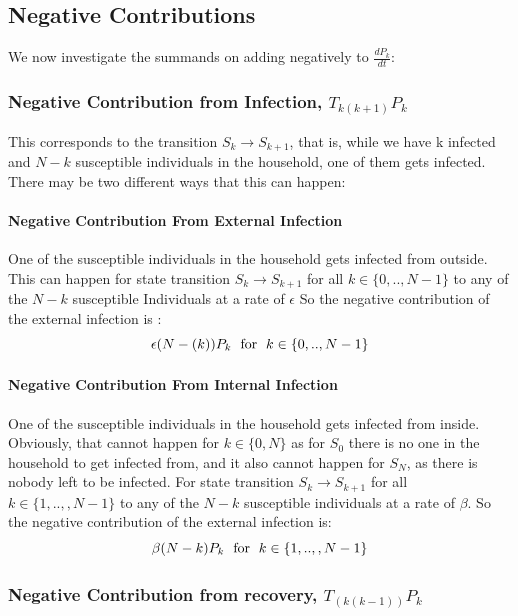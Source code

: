 \documentclass[paper=a4, fontsize=11pt, twoside, BCOR=12mm, parskip=full, listof=totoc]{scrreprt}
\begin{document}
\subsection*{Negative Contributions}
	We now investigate the summands on adding negatively to $\frac{dP_k}{dt}$:

\subsubsection*{Negative Contribution from Infection, $T_{k(k+1)}P_k$}
	This corresponds to the transition $S_{k}\rightarrow S_{k+1}$, that is, while we have k infected and $N-k$ susceptible individuals in the household, one of them  gets infected.
	There may be two different ways that this can happen:
\paragraph*{Negative Contribution From External Infection}
\label{Negative Contribution From External Infection} 
	One of the susceptible individuals in the household gets infected from outside. This can happen for state transition $S_{k}\rightarrow S_{k+1}$ for all $k \in \{0,..,N-1\} $ to any of the $N-k$ susceptible Individuals at a rate of $\epsilon $ So the negative contribution of the external infection is : \\
        $$ \epsilon(N-(k))P_{k} \text{\hspace{3pt} for \hspace{3pt}} k \in \{0,..,N-1\} $$
\paragraph*{Negative Contribution From Internal Infection}
\label{Negative Contribution From Internal Infection} 
	One of the susceptible individuals in the household gets infected from inside.
	Obviously, that cannot happen for $k\in \{0,N\}$ as for $S_0$ there is no one in the household to get
	infected from, and it also cannot happen for $S_N$, as there is nobody left to be infected. For state transition $S_{k}\rightarrow S_{k+1}$ for all $k \in \{1,..,,N-1\}$ to any of the $N-k$ susceptible individuals at a rate of $\beta$. So the negative contribution of the external infection is: \\
	$$ \beta(N-k)P_{k} \text{\hspace{3pt} for \hspace{3pt}} k \in  \{1,..,,N-1\} $$


\subsubsection*{Negative Contribution from recovery, $T_{(k(k-1))}P_k$}
\end{document}
